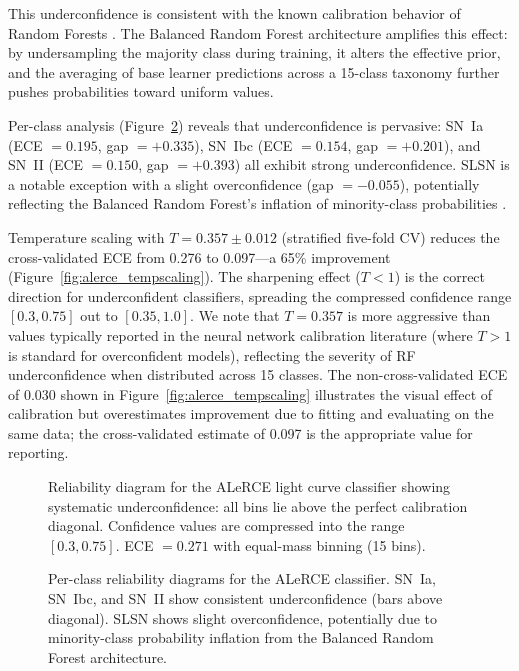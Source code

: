 \documentclass[twocolumn]{aastex631}
\begin{document}
This underconfidence is consistent with the known calibration behavior of Random Forests \citep{niculescumizil2005, bostrom2008}. The Balanced Random Forest architecture amplifies this effect: by undersampling the majority class during training, it alters the effective prior, and the averaging of base learner predictions across a 15-class taxonomy further pushes probabilities toward uniform values.

Per-class analysis (Figure~\ref{fig:alerce_perclass}) reveals that underconfidence is pervasive: SN~Ia (ECE $= 0.195$, gap $= +0.335$), SN~Ibc (ECE $= 0.154$, gap $= +0.201$), and SN~II (ECE $= 0.150$, gap $= +0.393$) all exhibit strong underconfidence. SLSN is a notable exception with a slight overconfidence (gap $= -0.055$), potentially reflecting the Balanced Random Forest's inflation of minority-class probabilities \citep{vandengoorbergh2022}.

Temperature scaling with $T = 0.357 \pm 0.012$ (stratified five-fold CV) reduces the cross-validated ECE from 0.276 to 0.097---a 65\% improvement (Figure~\ref{fig:alerce_tempscaling}). The sharpening effect ($T < 1$) is the correct direction for underconfident classifiers, spreading the compressed confidence range $[0.3, 0.75]$ out to $[0.35, 1.0]$. We note that $T = 0.357$ is more aggressive than values typically reported in the neural network calibration literature (where $T > 1$ is standard for overconfident models), reflecting the severity of RF underconfidence when distributed across 15 classes. The non-cross-validated ECE of 0.030 shown in Figure~\ref{fig:alerce_tempscaling} illustrates the visual effect of calibration but overestimates improvement due to fitting and evaluating on the same data; the cross-validated estimate of 0.097 is the appropriate value for reporting.

\begin{figure}
\caption{Reliability diagram for the ALeRCE light curve classifier showing systematic underconfidence: all bins lie above the perfect calibration diagonal. Confidence values are compressed into the range $[0.3, 0.75]$. ECE $= 0.271$ with equal-mass binning (15 bins). \label{fig:alerce_reliability}}
\end{figure}

\begin{figure}
\caption{Per-class reliability diagrams for the ALeRCE classifier. SN~Ia, SN~Ibc, and SN~II show consistent underconfidence (bars above diagonal). SLSN shows slight overconfidence, potentially due to minority-class probability inflation from the Balanced Random Forest architecture. \label{fig:alerce_perclass}}
\end{figure}
\end{document}
